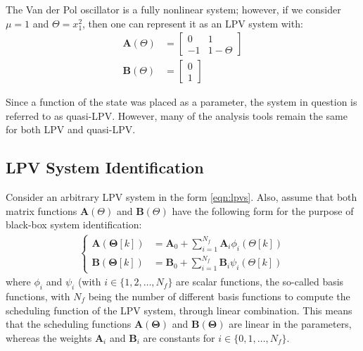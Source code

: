 The Van der Pol oscillator is a fully nonlinear system; however, if we consider $\mu = 1$ and $\Theta = x_1^2$, then one can represent it as an LPV system with:
\begin{equation}
\begin{aligned}
    \mathbf{A}(\Theta) &= 
    \begin{bmatrix}
      0 & 1\\
      -1 & 1 -\Theta
    \end{bmatrix}\\
    \mathbf{B}(\Theta) &=
    \begin{bmatrix}
        0\\
        1
    \end{bmatrix}
\end{aligned}
\end{equation}

Since a function of the state was placed as a parameter, the system in question is referred to as  quasi-LPV. However, many of the analysis tools remain the same for both LPV and quasi-LPV.


\subsection{LPV System Identification} \label{sec:lpv_ident}

Consider an arbitrary LPV system in the form \eqref{eqn:lpvs}.
%
Also, assume that both matrix functions $\mathbf{A}(\Theta)$ and $\mathbf{B}(\Theta)$ have the following form for the purpose of black-box system identification:
\begin{align}\label{eqn:scheduling_function}
\left \{ 
\begin{aligned}
    \mathbf{A}(\boldsymbol{\Theta}[k]) &= \mathbf{A}_0 + \sum_{i=1}^{N_f}\mathbf{A}_i\phi_i(\Theta[k])\\
    \mathbf{B}(\boldsymbol{\Theta}[k]) &= \mathbf{B}_0 + \sum_{i=1}^{N_f}\mathbf{B}_i\psi_i(\Theta[k])
    \end{aligned} \right .
\end{align}
where $\phi_i$ and $\psi_i$ (with $i \in \{1,2,\hdots,N_f\}$ are scalar functions, the so-called basis functions,  with $N_f$ being the number of different basis functions to compute the scheduling function of the LPV system, through linear combination. This means that the scheduling functions $\mathbf{A}(\boldsymbol{\Theta})$ and $\mathbf{B}(\boldsymbol{\Theta})$ are linear in the parameters, whereas the weights $\mathbf{A}_i$ and $\mathbf{B}_i$ are constants for $i \in \{0,1,\hdots,N_f\}$.
%


